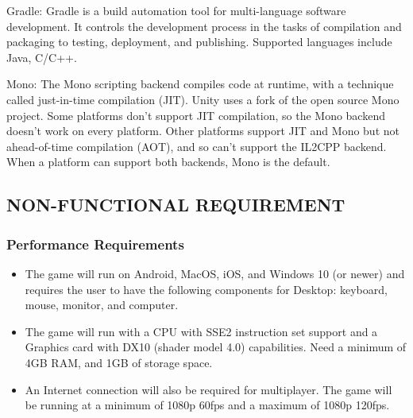 \documentclass[12pt]{report}
\begin{document}
Gradle: Gradle is a build automation tool for multi-language software development. It controls the development process in the tasks of compilation and packaging to testing, deployment, and publishing. Supported languages include Java, C/C++.

Mono: The Mono scripting backend compiles code at runtime, with a technique called just-in-time compilation (JIT). Unity uses a fork of the open source Mono project. Some platforms don’t support JIT compilation, so the Mono backend doesn’t work on every platform. Other platforms support JIT and Mono but not ahead-of-time compilation (AOT), and so can’t support the IL2CPP backend. When a platform can support both backends, Mono is the default.


\centering
\raggedright
\subsection{ NON-FUNCTIONAL REQUIREMENT}

\justifying
\setlength{\parindent}{4em}
\setlength{\parskip}{0.5em}
\renewcommand{\baselinestretch}{1.5}
\subsubsection{ Performance Requirements}
\normalsize\begin{itemize}
    \item The game will run on Android, MacOS, iOS, and Windows 10 (or newer) and requires the user to have the following components for Desktop: keyboard, mouse, monitor, and computer.
    \item The game will run with a CPU with SSE2 instruction set support and a Graphics card with DX10 (shader model 4.0) capabilities. Need a minimum of 4GB RAM, and 1GB of storage space.
    \item An Internet connection will also be required for multiplayer. The game will be running at a minimum of 1080p 60fps and a maximum of 1080p 120fps.
\end{itemize}
\end{document}
